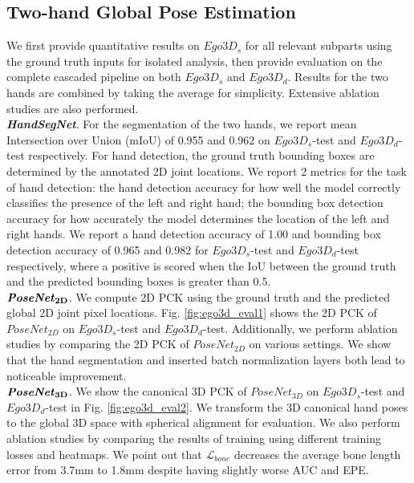 \documentclass[10pt,twocolumn,letterpaper]{article}
\begin{document}
\subsection{Two-hand Global Pose Estimation}\label{sec:experiments_glob}
\indent We first provide quantitative results on $Ego3D_{s}$ for all relevant subparts using the ground truth inputs for isolated analysis, then provide evaluation on the complete cascaded pipeline on both $Ego3D_{s}$ and $Ego3D_{d}$. Results for the two hands are combined by taking the average for simplicity. Extensive ablation studies are also performed.\\
\textbf{\textit{HandSegNet}}. For the segmentation of the two hands, we report mean Intersection over Union (mIoU) of 0.955 and 0.962 on $Ego3D_{s}$-test and $Ego3D_{d}$-test respectively. For hand detection, the ground truth bounding boxes are determined by the annotated 2D joint locations. We report 2 metrics for the task of hand detection: the hand detection accuracy for how well the model correctly classifies the presence of the left and right hand; the bounding box detection accuracy for how accurately the model determines the location of the left and right hands. We report a hand detection accuracy of 1.00 and bounding box detection accuracy of 0.965 and 0.982 for $Ego3D_{s}$-test and $Ego3D_{d}$-test respectively, where a positive is scored when the IoU between the ground truth and the predicted bounding boxes is greater than 0.5.\\
$\textbf{\textit{PoseNet}}_{\textbf{2D}}$. We compute 2D PCK using the ground truth and the predicted global 2D joint pixel locations. Fig. \ref{fig:ego3d_eval1} shows the 2D PCK of \textit{$PoseNet_{2D}$} on $Ego3D_{s}$-test and $Ego3D_{d}$-test. Additionally, we perform ablation studies by comparing the 2D PCK of \textit{$PoseNet_{2D}$} on various settings. We show that the hand segmentation and inserted batch normalization layers both lead to noticeable improvement.\\
$\textbf{\textit{PoseNet}}_{\textbf{3D}}$. We show the canonical 3D PCK of \textit{$PoseNet_{3D}$} on $Ego3D_{s}$-test and $Ego3D_{d}$-test in Fig. \ref{fig:ego3d_eval2}. We transform the 3D canonical hand poses to the global 3D space with spherical alignment for evaluation. We also perform ablation studies by comparing the results of training using different training losses and heatmaps. We point out that $\mathcal{L}_{bone}$ decreases the average bone length error from 3.7mm to 1.8mm despite having slightly worse AUC and EPE.\\
\end{document}

